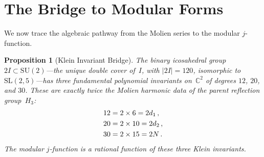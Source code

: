 \documentclass[11pt,letterpaper]{article}
\newtheorem{proposition}[theorem]{Proposition}
\theoremstyle{definition}
\newcommand{\abs}[1]{\lvert #1 \rvert}
\begin{document}
\section{The Bridge to Modular Forms}\label{sec:klein}
We now trace the algebraic pathway from the Molien series to the modular $j$-function.
\begin{proposition}[Klein Invariant Bridge]\label{prop:klein}
The binary icosahedral group $2I\subset\mathrm{SU}(2)$---the unique double cover of~$I$, with $\abs{2I}=120$, isomorphic to $\mathrm{SL}(2,5)$---has three fundamental polynomial invariants on~$\mathbb{C}^2$ of degrees $12$, $20$, and $30$.  These are exactly twice the Molien harmonic data of the parent reflection group~$H_3$:
\begin{align}
  12 &= 2\times 6 = 2d_1\,,\notag\\
  20 &= 2\times 10 = 2d_2\,,\label{eq:klein-doubling}\\
  30 &= 2\times 15 = 2N\,.\notag
\end{align}
The modular $j$-function is a rational function of these three Klein invariants.
\end{proposition}
\end{document}
